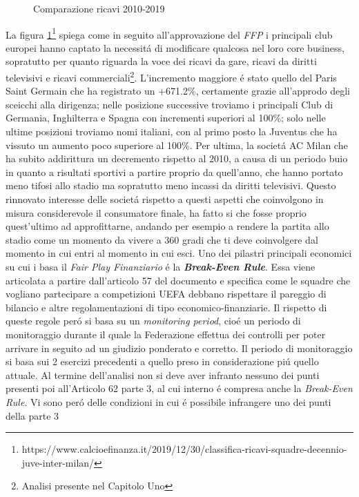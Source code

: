 \documentclass[
    corpo=12pt,
    oneside,
    evenboxes,
    tipotesi=triennale,
    stile=classica,
    oldstyle,
    autoretitolo,
    greek,
]{toptesi}
\begin{document}
\begin{interlinea}{1.5}
\begin{figure}
    \caption{Comparazione ricavi 2010-2019}
    \label{comp_ricavi_10_19}  
\end{figure}
La figura \ref{comp_ricavi_10_19}\footnote{https://www.calcioefinanza.it/2019/12/30/classifica-ricavi-squadre-decennio-juve-inter-milan/}
spiega come in seguito all'approvazione del \emph{FFP} i principali club europei hanno captato la necessit\'a di modificare qualcosa nel loro core business,
sopratutto per quanto riguarda la voce dei ricavi da gare, ricavi da diritti televisivi e ricavi commerciali\footnote{Analisi presente nel Capitolo Uno}.
L'incremento maggiore \'e stato quello del Paris Saint Germain che ha registrato un +671.2\%, certamente
grazie all'approdo degli sceicchi alla dirigenza; nelle posizione successive troviamo i principali Club di Germania, Inghilterra e Spagna
con incrementi superiori al 100\%; solo nelle ultime posizioni troviamo nomi italiani, con al primo posto la Juventus che ha vissuto un aumento 
poco superiore al 100\%. Per ultima, la societ\'a AC Milan che ha subito addirittura un decremento rispetto al 2010,
a causa di un periodo buio in quanto a risultati sportivi a partire proprio da quell'anno, che hanno portato meno tifosi allo stadio ma sopratutto meno incassi 
da diritti televisivi.\newline
Questo rinnovato interesse delle societ\'a rispetto a questi aspetti che coinvolgono in misura considerevole il consumatore finale, ha fatto
si che fosse proprio quest'ultimo ad approfittarne, andando per esempio a rendere la partita allo stadio come
un momento da vivere a 360 gradi che ti deve coinvolgere dal momento in cui entri al momento in cui esci.\newline
Uno dei pilastri principali economici su cui i basa il \emph{Fair Play Finanziario} \'e la \emph{\textbf{Break-Even Rule}}.
Essa viene articolata a partire dall'articolo 57 del documento e specifica come le squadre che vogliano partecipare a competizioni UEFA debbano
rispettare il pareggio di bilancio e altre regolamentazioni di tipo economico-finanziarie. Il rispetto di queste regole per\'o si basa su 
un \emph{monitoring period}, cio\'e un periodo di monitoraggio durante il quale la Federazione effettua dei controlli per poter arrivare in seguito 
ad un giudizio ponderato e corretto. Il periodo di monitoraggio si basa sui 2 esercizi precedenti a quello preso in considerazione pi\'u quello attuale.
Al termine dell'analisi non si deve aver infranto nessuno dei punti presenti poi all'Articolo 62 parte 3, al cui interno 
\'e compresa anche la \emph{Break-Even Rule}. Vi sono per\'o delle condizioni in cui \'e possibile infrangere uno dei punti della parte 3 

\end{interlinea}
\end{document}
